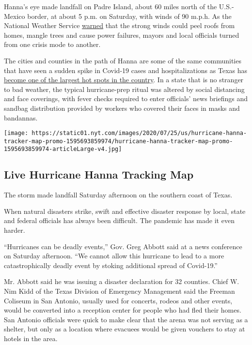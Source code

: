 Hanna's eye made landfall on Padre Island, about 60 miles north of the
U.S.-Mexico border, at about 5 p.m. on Saturday, with winds of 90 m.p.h.
As the National Weather Service
\href{https://forecast.weather.gov/showsigwx.php?warnzone=TXZ242\&warncounty=TXC273\&firewxzone=TXZ242\&local_place1=3\%20Miles\%20NNE\%20Kingsville,\%20Naval\%20Air\%20Station\%20TX\&product1=Hurricane+Warning\#.XxxWW55KjIV}{warned}
that the strong winds could peel roofs from homes, mangle trees and
cause power failures, mayors and local officials turned from one crisis
mode to another.

The cities and counties in the path of Hanna are some of the same
communities that have seen a sudden spike in Covid-19 cases and
hospitalizations as Texas has
\href{https://www.nytimes.com/interactive/2020/us/texas-coronavirus-cases.html}{become
one of the largest hot spots in the country}. In a state that is no
stranger to bad weather, the typical hurricane-prep ritual was altered
by social distancing and face coverings, with fever checks required to
enter officials' news briefings and sandbag distribution provided by
workers who covered their faces in masks and bandannas.

\href{https://www.nytimes.com/interactive/2020/07/25/us/hurricane-hanna-tracker-map.html}{}

\texttt{[image: https://static01.nyt.com/images/2020/07/25/us/hurricane-hanna-tracker-map-promo-1595693859974/hurricane-hanna-tracker-map-promo-1595693859974-articleLarge-v4.jpg]}

\hypertarget{live-hurricane-hanna-tracking-map}{%
\subsection{Live Hurricane Hanna Tracking
Map}\label{live-hurricane-hanna-tracking-map}}

The storm made landfall Saturday afternoon on the southern coast of
Texas.

When natural disasters strike, swift and effective disaster response by
local, state and federal officials has always been difficult. The
pandemic has made it even harder.

``Hurricanes can be deadly events,'' Gov. Greg Abbott said at a news
conference on Saturday afternoon. ``We cannot allow this hurricane to
lead to a more catastrophically deadly event by stoking additional
spread of Covid-19.''

Mr. Abbott said he was issuing a disaster declaration for 32 counties.
Chief W. Nim Kidd of the Texas Division of Emergency Management said the
Freeman Coliseum in San Antonio, usually used for concerts, rodeos and
other events, would be converted into a reception center for people who
had fled their homes. San Antonio officials were quick to make clear
that the arena was not serving as a shelter, but only as a location
where evacuees would be given vouchers to stay at hotels in the area.

